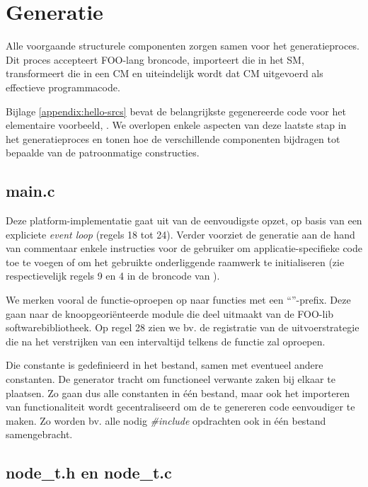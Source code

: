 
\section{Generatie}
\label{section:generation}

Alle voorgaande structurele componenten zorgen samen voor het generatieproces.
Dit proces accepteert FOO-lang broncode, importeert die in het SM,
transformeert die in een CM en uiteindelijk wordt dat CM uitgevoerd als
effectieve programmacode.

Bijlage \ref{appendix:hello-srcs} bevat de belangrijkste gegenereerde code voor
het elementaire voorbeeld, . We overlopen enkele aspecten van
deze laatste stap in het generatieproces en tonen hoe de verschillende
componenten bijdragen tot bepaalde van de patroonmatige constructies.

\subsection{main.c}

Deze platform-implementatie gaat uit van de eenvoudigste opzet, op basis van
een expliciete \emph{event loop} (regels 18 tot 24). Verder voorziet de
generatie aan de hand van commentaar enkele instructies voor de gebruiker om
applicatie-specifieke code toe te voegen of om het gebruikte onderliggende
raamwerk te initialiseren (zie respectievelijk regels 9 en 4 in de broncode van
).

We merken vooral de functie-oproepen op naar functies met een
``''-prefix. Deze gaan naar de  knoopgeori\"enteerde
module die deel uitmaakt van de FOO-lib softwarebibliotheek. Op regel 28 zien
we bv. de registratie van de uitvoerstrategie die na het verstrijken van een
intervaltijd telkens de functie  zal oproepen.

Die  constante is gedefinieerd in het  bestand,
samen met eventueel andere constanten. De generator tracht om functioneel
verwante zaken bij elkaar te plaatsen. Zo gaan dus alle constanten in \'e\'en
bestand, maar ook het importeren van functionaliteit wordt gecentraliseerd om
de te genereren code eenvoudiger te maken. Zo worden bv. alle nodig
\emph{\#include} opdrachten ook in \'e\'en  bestand
samengebracht.

\subsection{node\_t.h en node\_t.c}


